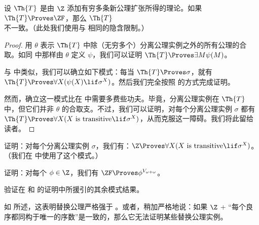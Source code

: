 \documentclass[../../../include/open-logic-section]{subfiles}
\begin{document}
\begin{prop}
	设 $\Th{T}$ 是由 $\Z$ 添加有穷多条新公理扩张所得的理论。如果 $\Th{T} \Proves \ZF$，那么 $\Th{T}$ 不一致。（此处我们使用与  相同的隐含限制。）
\end{prop}
\begin{proof}
	用 $\theta$ 表示 $\Th{T}$ 中除（无穷多个）分离公理实例之外的所有公理的合取。如同  中那样由 $\theta$ 定义 $\psi$，我们可以证明 $\Th{T} \Proves \exists M \psi(M)$。

	与  中类似，我们可以确立如下模式：每当 $\Th{T} \Proves \sigma$，就有 $\Th{T} \Proves \forall X(\psi(X) \lif \sigma^X)$。然后我们完全按照  的方式完成证明。

	然而，确立这一模式比在  中需要多费些功夫。毕竟，分离公理实例在 $\Th{T}$ 中，但它们并非 $\theta$ 的合取支。不过，我们可以证明，对每个分离公理实例 $\sigma$ 都有 $\Th{T} \Proves \forall X(X\text{ is transitive} \lif \sigma^X)$，从而克服这一障碍。我们将此留给读者。
\end{proof}
\begin{prob}
	证明：对每个分离公理实例 $\sigma$，我们有：$\Z \Proves \forall X(X\text{ is transitive} \lif \sigma^X)$。（我们在  中使用了这个模式。）
\end{prob}
\begin{prob}
	证明：对每个 $\phi \in \Z$，我们有 $\ZF \Proves \phi^{V_{\omega+\omega}}$。
\end{prob}
\begin{prob}
	验证在  和  的证明中所援引的其余模式结果。
\end{prob}

如  所述，这表明替换公理严格强于
。或者，稍加严格地说：如果 $\Z$ + “每个良序都同构于唯一的序数”是一致的，那么它无法证明某些替换公理实例。


\end{document}
